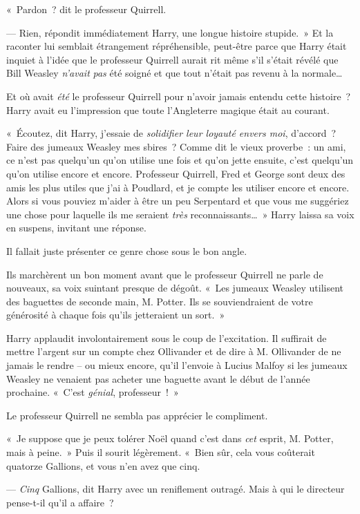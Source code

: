 «~Pardon~? dit le professeur Quirrell.

--- Rien, répondit immédiatement Harry, une longue histoire stupide.~» Et la raconter lui semblait étrangement répréhensible, peut-être parce que Harry était inquiet à l'idée que le professeur Quirrell aurait rit même s'il s'était révélé que Bill Weasley \emph{n'avait} \emph{pas} été soigné et que tout n'était pas revenu à la normale…

Et où avait \emph{été} le professeur Quirrell pour n'avoir jamais entendu cette histoire~? Harry avait eu l'impression que toute l'Angleterre magique était au courant.

«~Écoutez, dit Harry, j'essaie de \emph{solidifier leur loyauté envers moi}, d'accord~? Faire des jumeaux Weasley mes sbires~? Comme dit le vieux proverbe~: un ami, ce n'est pas quelqu'un qu'on utilise une fois et qu'on jette ensuite, c'est quelqu'un qu'on utilise encore et encore. Professeur Quirrell, Fred et George sont deux des amis les plus utiles que j'ai à Poudlard, et je compte les utiliser encore et encore. Alors si vous pouviez m'aider à être un peu Serpentard et que vous me suggériez une chose pour laquelle ils me seraient \emph{très} reconnaissants…~» Harry laissa sa voix en suspens, invitant une réponse.

Il fallait juste présenter ce genre chose sous le bon angle.

Ils marchèrent un bon moment avant que le professeur Quirrell ne parle de nouveaux, sa voix suintant presque de dégoût. «~Les jumeaux Weasley utilisent des baguettes de seconde main, M. Potter. Ils se souviendraient de votre générosité à chaque fois qu'ils jetteraient un sort.~»

Harry applaudit involontairement sous le coup de l'excitation. Il suffirait de mettre l'argent sur un compte chez Ollivander et de dire à M. Ollivander de ne jamais le rendre -- ou mieux encore, qu'il l'envoie à Lucius Malfoy si les jumeaux Weasley ne venaient pas acheter une baguette avant le début de l'année prochaine. «~C'est \emph{génial}, professeur~!~»

Le professeur Quirrell ne sembla pas apprécier le compliment.

«~Je suppose que je peux tolérer Noël quand c'est dans \emph{cet} esprit, M. Potter, mais à peine.~» Puis il sourit légèrement. «~Bien sûr, cela vous coûterait quatorze Gallions, et vous n'en avez que cinq.

--- \emph{Cinq} Gallions, dit Harry avec un reniflement outragé. Mais à qui le directeur pense-t-il qu'il a affaire~?

